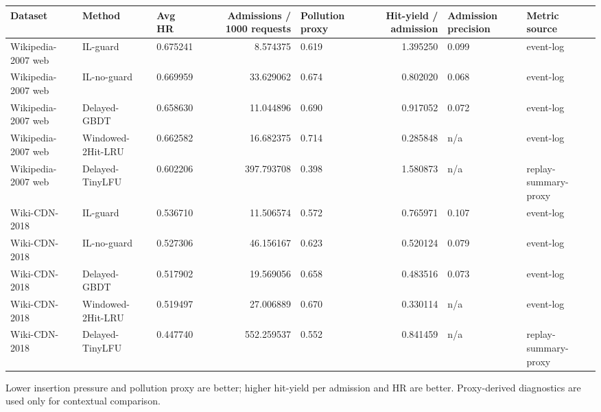\begin{tabular}{lllrlrll}
\toprule
Dataset & Method & Avg HR & Admissions / 1000 requests & Pollution proxy & Hit-yield / admission & Admission precision & Metric source \\
\midrule
Wikipedia-2007 web & IL-guard & 0.675241 & 8.574375 & 0.619 & 1.395250 & 0.099 & event-log \\
Wikipedia-2007 web & IL-no-guard & 0.669959 & 33.629062 & 0.674 & 0.802020 & 0.068 & event-log \\
Wikipedia-2007 web & Delayed-GBDT & 0.658630 & 11.044896 & 0.690 & 0.917052 & 0.072 & event-log \\
Wikipedia-2007 web & Windowed-2Hit-LRU & 0.662582 & 16.682375 & 0.714 & 0.285848 & n/a & event-log \\
Wikipedia-2007 web & Delayed-TinyLFU & 0.602206 & 397.793708 & 0.398 & 1.580873 & n/a & replay-summary-proxy \\
Wiki-CDN-2018 & IL-guard & 0.536710 & 11.506574 & 0.572 & 0.765971 & 0.107 & event-log \\
Wiki-CDN-2018 & IL-no-guard & 0.527306 & 46.156167 & 0.623 & 0.520124 & 0.079 & event-log \\
Wiki-CDN-2018 & Delayed-GBDT & 0.517902 & 19.569056 & 0.658 & 0.483516 & 0.073 & event-log \\
Wiki-CDN-2018 & Windowed-2Hit-LRU & 0.519497 & 27.006889 & 0.670 & 0.330114 & n/a & event-log \\
Wiki-CDN-2018 & Delayed-TinyLFU & 0.447740 & 552.259537 & 0.552 & 0.841459 & n/a & replay-summary-proxy \\
\bottomrule
\end{tabular}
\vspace{0.4ex}
\noindent\scriptsize{Lower insertion pressure and pollution proxy are better; higher hit-yield per admission and HR are better. Proxy-derived diagnostics are used only for contextual comparison.}

